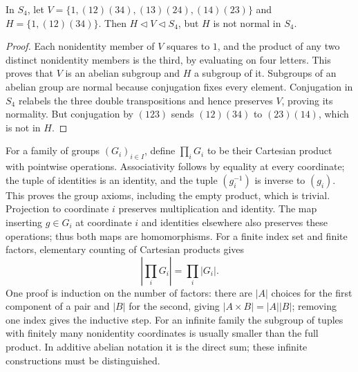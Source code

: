 \begin{example}\label{ex:normality-not-transitive}
In $S_4$, let $V=\{1,(12)(34),(13)(24),(14)(23)\}$ and $H=\{1,(12)(34)\}$. Then $H\mathrel{\triangleleft}V\mathrel{\triangleleft}S_4$, but $H$ is not normal in $S_4$.
\end{example}
\begin{proof}
Each nonidentity member of $V$ squares to $1$, and the product of any two distinct nonidentity members is the third, by evaluating on four letters. This proves that $V$ is an abelian subgroup and $H$ a subgroup of it. Subgroups of an abelian group are normal because conjugation fixes every element. Conjugation in $S_4$ relabels the three double transpositions and hence preserves $V$, proving its normality. But conjugation by $(123)$ sends $(12)(34)$ to $(23)(14)$, which is not in $H$.
\end{proof}

For a family of groups $(G_i)_{i\in I}$, define $\prod_iG_i$ to be their Cartesian product with pointwise operations. Associativity follows by equality at every coordinate; the tuple of identities is an identity, and the tuple $(g_i^{-1})$ is inverse to $(g_i)$. This proves the group axioms, including the empty product, which is trivial. Projection to coordinate $i$ preserves multiplication and identity. The map inserting $g\in G_i$ at coordinate $i$ and identities elsewhere also preserves these operations; thus both maps are homomorphisms. For a finite index set and finite factors, elementary counting of Cartesian products gives
\[
 \left|\prod_iG_i\right|=\prod_i|G_i|.
\]
One proof is induction on the number of factors: there are $|A|$ choices for the first component of a pair and $|B|$ for the second, giving $|A\times B|=|A||B|$; removing one index gives the inductive step. For an infinite family the subgroup of tuples with finitely many nonidentity coordinates is usually smaller than the full product. In additive abelian notation it is the direct sum; these infinite constructions must be distinguished.

